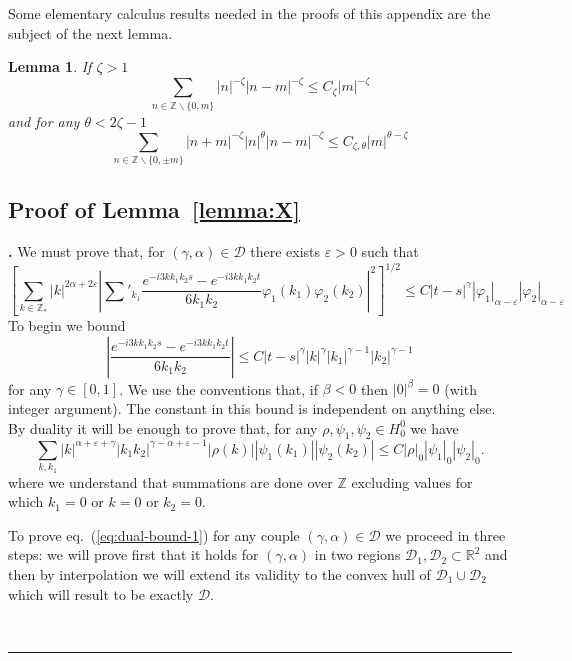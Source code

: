 \documentclass[a4paper,11pt,reqno]{article}
\newcommand{\eps}{\varepsilon}
\newcommand{\RR}{\mathbb{R}}
\newcommand{\DD}{\mathcal{D}}
\newcommand{\ZZ}{\mathbb{Z}}
\newtheorem{lemma}[theorem]{Lemma}
\newenvironment{proof}[1][Proof]{\textbf{#1.} }{\ \rule{0.5em}{0.5em}}
\begin{document}
Some elementary calculus results needed in the proofs of this appendix are the
subject of the next lemma.

\begin{lemma}
\label{lemma:sums}
If $\zeta > 1$ 
$$
\sum_{n\in \ZZ \backslash \{0, m \}}
    |n|^{-\zeta} |n-m|^{-\zeta} \le C_\zeta |m|^{-\zeta}
$$
and for any $\theta < 2\zeta-1$
$$
\sum_{n\in \ZZ \backslash \{0,\pm m \}}
    |n+m|^{-\zeta} |n|^{\theta} |n-m|^{-\zeta} \le C_{\zeta,\theta} |m|^{\theta-\zeta}
$$  
\end{lemma}

\subsection{Proof of Lemma~\ref{lemma:X}}

\begin{proof}[]
We must prove that, for $(\gamma,\alpha) \in \DD$ there exists $\eps > 0$ such that
$$
\left[
\sum_{k \in \ZZ_*} |k|^{2\alpha+2\eps} \left|\sum'_{k_1} \frac{e^{-i 3 k k_1 k_2
      s}-e^{-i 3 k k_1 k_2 t}}{6 k_1 k_2} \varphi_1(k_1)\varphi_2(k_2)
\right|^2 \right]^{1/2}\le C |t-s|^\gamma |\varphi_1|_{\alpha-\eps} |\varphi_2|_{\alpha-\eps}
$$
To begin we bound
$$
\left| \frac{e^{-i 3 k k_1 k_2
      s}-e^{-i 3 k k_1 k_2 t}}{6 k_1 k_2}\right| \le C |t-s|^\gamma
|k|^\gamma |k_1|^{\gamma-1} |k_2|^{\gamma-1}
$$
for any $\gamma \in[0,1]$.
We use the conventions that, if $\beta < 0$ then  $|0|^\beta =
0$ (with integer argument). The constant in this bound is independent on anything else.
By duality it will be enough to prove that, for any $\rho,\psi_1,\psi_2 \in
H^0_0$ we have
\begin{equation}
  \label{eq:dual-bound-1}
\sum_{k, k_1}  |k|^{\alpha+\eps+\gamma} |k_1 k_2|^{\gamma-\alpha+\eps-1} 
|\rho(k)| |\psi_1(k_1)| |\psi_2(k_2)| \le C |\rho|_0 |\psi_1|_{0} |\psi_2|_{0}.  
\end{equation}
where we understand that summations are done over $\ZZ$ excluding
values for which $k_1 = 0$ or $k = 0$ or $k_2 = 0$.
 
To prove eq.~(\ref{eq:dual-bound-1}) for any couple
$(\gamma,\alpha)\in \DD$ we proceed in three steps: we will
prove first that it holds for $(\gamma,\alpha)$ in two regions
$\DD_1,\DD_2 \subset \RR^2 $ and then by interpolation we will
extend its validity to the convex hull of $\DD_1 \cup
\DD_2$ which will result to be exactly $\DD$. 


\end{proof}
\end{document}

